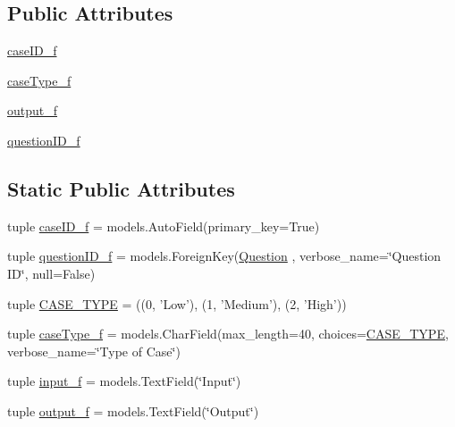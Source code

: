 \subsection*{Public Attributes}
\begin{DoxyCompactItemize}
\item 
\hyperlink{class_ecodena_1_1_question_1_1models_1_1_test_case_ae271617c1377ad90ebc7227e91f0d0ee}{caseID\_\-f}
\item 
\hyperlink{class_ecodena_1_1_question_1_1models_1_1_test_case_a80958774ad2d97cb0fabfa415e005000}{caseType\_\-f}
\item 
\hyperlink{class_ecodena_1_1_question_1_1models_1_1_test_case_a473cfbf8b45a5d58f41d0039a81b63e9}{output\_\-f}
\item 
\hyperlink{class_ecodena_1_1_question_1_1models_1_1_test_case_a4eaa0f7fd04446273a67763384bae16a}{questionID\_\-f}
\end{DoxyCompactItemize}
\subsection*{Static Public Attributes}
\begin{DoxyCompactItemize}
\item 
tuple \hyperlink{class_ecodena_1_1_question_1_1models_1_1_test_case_a9448c3b3b6da8aba864e4b8bec30bb17}{caseID\_\-f} = models.AutoField(primary\_\-key=True)
\item 
tuple \hyperlink{class_ecodena_1_1_question_1_1models_1_1_test_case_aff1b8bd697b5da73fa42101d8c4a9ddd}{questionID\_\-f} = models.ForeignKey(\hyperlink{class_ecodena_1_1_question_1_1models_1_1_question}{Question} , verbose\_\-name=\char`\"{}Question ID\char`\"{}, null=False)
\item 
tuple \hyperlink{class_ecodena_1_1_question_1_1models_1_1_test_case_ac97ffb43d06bc68c890867f84dc89f44}{CASE\_\-TYPE} = ((0, 'Low'), (1, 'Medium'), (2, 'High'))
\item 
tuple \hyperlink{class_ecodena_1_1_question_1_1models_1_1_test_case_a0fc9e08f3ccdc4e9590f7778eb685ba8}{caseType\_\-f} = models.CharField(max\_\-length=40, choices=\hyperlink{class_ecodena_1_1_question_1_1models_1_1_test_case_ac97ffb43d06bc68c890867f84dc89f44}{CASE\_\-TYPE}, verbose\_\-name=\char`\"{}Type of Case\char`\"{})
\item 
tuple \hyperlink{class_ecodena_1_1_question_1_1models_1_1_test_case_aeb7c46e67e81b2ca870c79c8968fcdcf}{input\_\-f} = models.TextField(\char`\"{}Input\char`\"{})
\item 
tuple \hyperlink{class_ecodena_1_1_question_1_1models_1_1_test_case_a1bec76507b23217cbf131c113623cad9}{output\_\-f} = models.TextField(\char`\"{}Output\char`\"{})
\end{DoxyCompactItemize}
